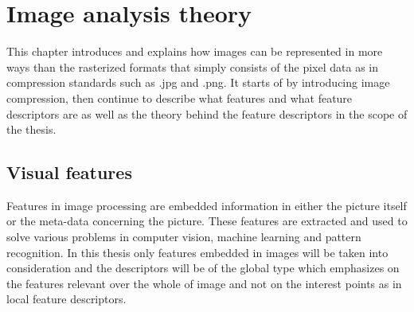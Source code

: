\chapter{Image analysis theory}
\label{chapter:imagetheory}

This chapter introduces and explains how images can be represented in more ways than the rasterized formats that simply consists of the pixel data as in compression standards such as .jpg and .png. It  starts of by introducing image compression, then continue to describe what features and what feature descriptors are  as well as the theory behind the feature descriptors in the scope of the thesis.


\section{Visual features}
\label{sec:image_features}
Features in image processing are embedded information in either the picture itself or the meta-data concerning the picture. These features are extracted and used to solve various problems in computer vision, machine learning and pattern recognition. In this thesis only features embedded in images will be taken into consideration and the descriptors will be of the global type which emphasizes on the features relevant over the whole of image and not on the interest points as in local feature descriptors. 

